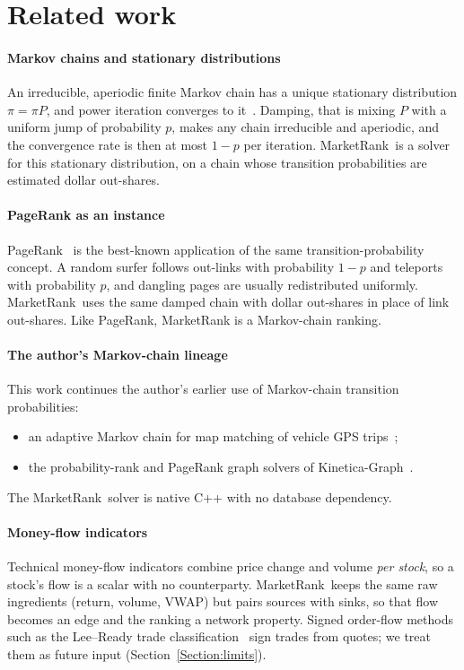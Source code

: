 \documentclass[preprint,3p,twocolumn]{elsarticle}
\newcommand{\MR}{MarketRank}
\begin{document}
\section{Related work}
\label{Section:related}

\paragraph{Markov chains and stationary distributions} An irreducible, aperiodic finite Markov chain has a unique stationary distribution $\pi=\pi P$, and power iteration converges to it~\cite{norris,kemenysnell}. Damping, that is mixing $P$ with a uniform jump of probability $p$, makes any chain irreducible and aperiodic, and the convergence rate is then at most $1-p$ per iteration. \MR\ is a solver for this stationary distribution, on a chain whose transition probabilities are estimated dollar out-shares.

\paragraph{PageRank as an instance} PageRank~\cite{brinpage,pagerank} is the best-known application of the same transition-probability concept. A random surfer follows out-links with probability $1-p$ and teleports with probability $p$, and dangling pages are usually redistributed uniformly. \MR\ uses the same damped chain with dollar out-shares in place of link out-shares. Like PageRank, MarketRank is a Markov-chain ranking.

\paragraph{The author's Markov-chain lineage} This work continues the author's earlier use of Markov-chain transition probabilities:
\begin{itemize}
\item an adaptive Markov chain for map matching of vehicle GPS trips~\cite{kineticamapmatching};
\item the probability-rank and PageRank graph solvers of Kinetica-Graph~\cite{kineticagraph,kinetica}.
\end{itemize}
The \MR\ solver is native C++ with no database dependency.

\paragraph{Money-flow indicators} Technical money-flow indicators combine price change and volume \emph{per stock}, so a stock's flow is a scalar with no counterparty. \MR\ keeps the same raw ingredients (return, volume, VWAP) but pairs sources with sinks, so that flow becomes an edge and the ranking a network property. Signed order-flow methods such as the Lee--Ready trade classification~\cite{leeready} sign trades from quotes; we treat them as future input (Section~\ref{Section:limits}).
\end{document}
